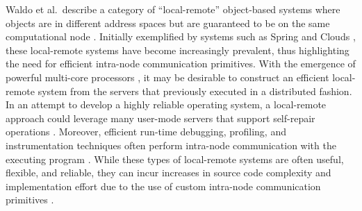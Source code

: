 \documentclass{sig-alternate}
\begin{document}


				   



Waldo et al.\ describe a category of ``local-remote'' object-based
systems where objects are in different address spaces but are
guaranteed to be on the same computational node \cite{waldo-note}.
Initially exemplified by systems such as Spring \cite{radia-spring}
and Clouds \cite{dasgupta-clouds}, these local-remote systems have
become increasingly prevalent, thus highlighting the need for
efficient intra-node communication primitives.  With the emergence of
powerful multi-core processors
\cite{lowney-multi-core,schalnsker-multi-core}, it may be desirable to
construct an efficient local-remote system from the servers that
previously executed in a distributed fashion.  In an attempt to
develop a highly reliable operating system, a local-remote approach
could leverage many user-mode servers that support self-repair
operations \cite{tanenbaum-minix3,herder-microkernel}.  Moreover,
efficient run-time debugging, profiling, and instrumentation
techniques often perform intra-node communication with the executing
program \cite{binder-instrument,wallace07superpin}.  While these types
of local-remote systems are often useful, flexible, and reliable, they
can incur increases in source code complexity and implementation
effort due to the use of custom intra-node communication primitives
\cite{tanenbaum-minix3,tang-code-complex,vaidyanathan-grid}.
\end{document}
